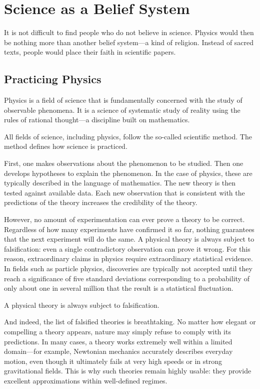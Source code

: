 \chapter{Science as a Belief System}
\label{chap:science-as-belief-system}

It is not difficult to find people who do not believe in science.
Physics would then be nothing more than another belief system—a kind of religion.
Instead of sacred texts, people would place their faith in scientific papers.


\section{Practicing Physics}

Physics is a field of science that is fundamentally concerned with the study of observable phenomena.
It is a science of systematic study of reality using the rules of rational thought—a discipline built on mathematics.

All fields of science, including physics, follow the so-called
scientific method. The method defines how science is practiced.

First, one makes observations about the phenomenon
to be studied. Then one develops hypotheses to explain the phenomenon. In
the case of physics, these are typically described in the language of
mathematics. The new theory is then tested against available
data. Each new observation that is consistent with the predictions
of the theory increases the credibility of the theory.

However, no amount of experimentation can ever prove a theory to be correct.
Regardless of how many experiments have confirmed it so far, nothing guarantees that the next experiment will do the same.
A physical theory is always subject to falsification: even a single contradictory observation can prove it wrong.
For this reason, extraordinary claims in physics require extraordinary statistical evidence.
In fields such as particle physics, discoveries are typically not accepted until they reach a significance of five standard deviations
corresponding to a probability of only about one in several million that the result is a statistical fluctuation.

A physical theory is always subject to falsification.

And indeed, the list of falsified theories is breathtaking. No matter how elegant or compelling a theory appears, nature may simply refuse to comply with its predictions. 
In many cases, a theory works extremely well within a limited domain—for example, Newtonian mechanics accurately describes everyday motion, even though it ultimately fails at very high speeds or in strong gravitational fields. 
This is why such theories remain highly usable: they provide excellent approximations within well-defined regimes.

